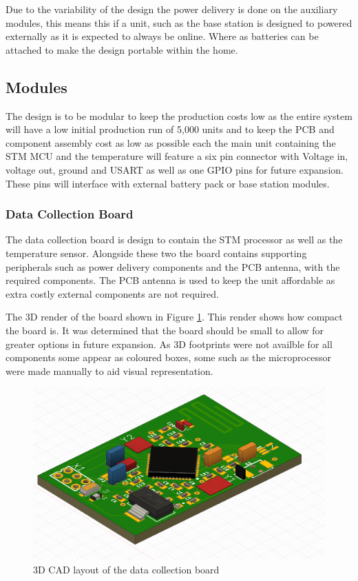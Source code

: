 \documentclass[12pt]{article}
\begin{document}
Due to the variability of the design the power delivery is done on the auxiliary modules, this
means this if a unit, such as the base station is designed to powered externally as it is expected
to always be online. Where as batteries can be attached to make the design portable within the
home.

\subsection{Modules}
The design is to be modular to keep the production costs low as the entire system will have a low
initial production run of 5,000 units and to keep the PCB and component assembly cost as low as
possible each the main unit containing the STM MCU and the temperature will feature a six pin
connector with Voltage in, voltage out, ground and USART as well as one GPIO pins for future 
expansion. These pins will interface with external battery pack or base station modules.

\subsubsection{Data Collection Board}
The data collection board is design to contain the STM processor as well as the temperature 
sensor. Alongside these two the board contains supporting peripherals such as power delivery
components and the PCB antenna, with the required components. The PCB antenna is used to keep the
unit affordable as extra costly external components are not required.

The 3D render of the board shown in Figure {\ref{fig:3dpcb}}. This render shows how compact the
board is. It was determined that the board should be small to allow for greater options in future
expansion. As 3D footprints were not availble for all components some appear as coloured boxes,
some such as the microprocessor were made manually to aid visual representation.

\begin{figure}[H]
\includegraphics[width=\textwidth]{3D-PCB}
\caption{3D CAD layout of the data collection board}
\label{fig:3dpcb}
\end{figure}
\end{document}
